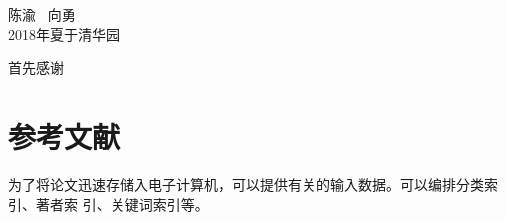 \documentclass{zhbook}
\begin{document}
\begin{preface}
\vspace{1cm}
\begin{flushright}
陈渝 \ 向勇\\
2018年夏于清华园
\end{flushright}

\end{preface}

\tableofcontents

\listoffigures

\listoftables

\mainmatter













\begin{acknowledgement}
  首先感谢
\end{acknowledgement}

\appendix

% 

\section{参考文献}

为了将论文迅速存储入电子计算机，可以提供有关的输入数据。可以编排分类索引、著者索
引、关键词索引等。

\nocite{*}

%
%

\appendix


\end{document}

